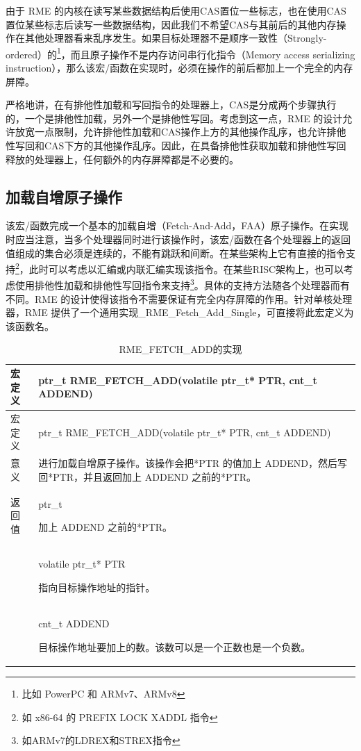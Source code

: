 由于 RME 的内核在读写某些数据结构后使用CAS置位一些标志，也在使用CAS置位某些标志后读写一些数据结构，因此我们不希望CAS与其前后的其他内存操作在其他处理器看来乱序发生。如果目标处理器不是顺序一致性（Strongly-ordered）的\footnote{比如 PowerPC 和 ARMv7、ARMv8}，而且原子操作不是内存访问串行化指令（Memory
access serializing
instruction），那么该宏/函数在实现时，必须在操作的前后都加上一个完全的内存屏障。

严格地讲，在有排他性加载和写回指令的处理器上，CAS是分成两个步骤执行的，一个是排他性加载，另外一个是排他性写回。考虑到这一点，RME 的设计允许放宽一点限制，允许排他性加载和CAS操作上方的其他操作乱序，也允许排他性写回和CAS下方的其他操作乱序。因此，在具备排他性获取加载和排他性写回释放的处理器上，任何额外的内存屏障都是不必要的。

\subsection{加载自增原子操作}\label{subsec:7-fetch-and-add-atomic-operation}

该宏/函数完成一个基本的加载自增（Fetch-And-Add，FAA）原子操作。在实现时应当注意，当多个处理器同时进行该操作时，该宏/函数在各个处理器上的返回值组成的集合必须是连续的，不能有跳跃和间断。在某些架构上它有直接的指令支持\footnote{如 x86-64 的 PREFIX LOCK XADDL 指令}，此时可以考虑以汇编或内联汇编实现该指令。在某些RISC架构上，也可以考虑使用排他性加载和排他性写回指令来支持\footnote{如ARMv7的LDREX和STREX指令}。具体的支持方法随各个处理器而有不同。RME 的设计使得该指令不需要保证有完全内存屏障的作用。针对单核处理器，RME 提供了一个通用实现\_RME\_Fetch\_Add\_Single，可直接将此宏定义为该函数名。

\begin{xltabular}{\textwidth}{@{}>{\hsize\raggedright\arraybackslash}X>{\hsize\raggedright\arraybackslash}X@{}}
\caption{RME\_FETCH\_ADD的实现}\label{tab:7-32-rme-fetch-add-implementation}\\
\toprule
宏定义 & ptr\_t RME\_FETCH\_ADD(volatile ptr\_t* PTR, cnt\_t
ADDEND)\tabularnewline
\endfirsthead
\toprule
宏定义 & ptr\_t RME\_FETCH\_ADD(volatile ptr\_t* PTR, cnt\_t
ADDEND)\tabularnewline
\midrule
\endhead
\bottomrule
\endlastfoot
意义 &
进行加载自增原子操作。该操作会把*PTR 的值加上 ADDEND，然后写回*PTR，并且返回加上 ADDEND 之前的*PTR。\tabularnewline
返回值\strut
 & ptr\_t

加上 ADDEND 之前的*PTR。\strut
\tabularnewline
{} & volatile ptr\_t* PTR

指向目标操作地址的指针。\strut
\tabularnewline
\strut
 & cnt\_t ADDEND

目标操作地址要加上的数。该数可以是一个正数也是一个负数。\strut
\tabularnewline
\end{xltabular}

